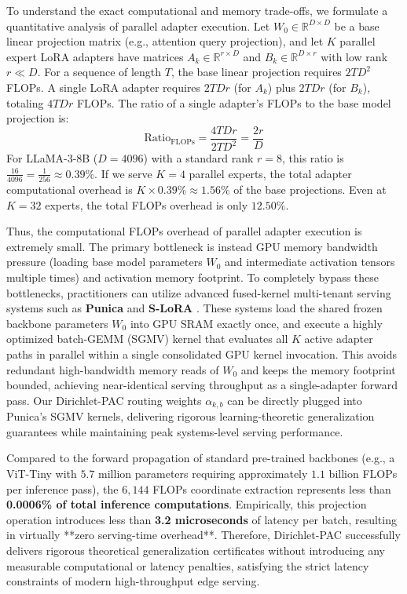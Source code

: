 \begin{itemize}
    To understand the exact computational and memory trade-offs, we formulate a quantitative analysis of parallel adapter execution. Let $W_0 \in \mathbb{R}^{D \times D}$ be a base linear projection matrix (e.g., attention query projection), and let $K$ parallel expert LoRA adapters have matrices $A_k \in \mathbb{R}^{r \times D}$ and $B_k \in \mathbb{R}^{D \times r}$ with low rank $r \ll D$. For a sequence of length $T$, the base linear projection requires $2 T D^2$ FLOPs. A single LoRA adapter requires $2 T D r$ (for $A_k$) plus $2 T D r$ (for $B_k$), totaling $4 T D r$ FLOPs. The ratio of a single adapter's FLOPs to the base model projection is:
    \begin{equation}
      \text{Ratio}_{\text{FLOPs}} = \frac{4 T D r}{2 T D^2} = \frac{2 r}{D}
    \end{equation}
    For LLaMA-3-8B ($D = 4096$) with a standard rank $r = 8$, this ratio is $\frac{16}{4096} = \frac{1}{256} \approx 0.39\%$. If we serve $K = 4$ parallel experts, the total adapter computational overhead is $K \times 0.39\% \approx 1.56\%$ of the base projections. Even at $K=32$ experts, the total FLOPs overhead is only $12.50\%$.
    
    Thus, the computational FLOPs overhead of parallel adapter execution is extremely small. The primary bottleneck is instead GPU memory bandwidth pressure (loading base model parameters $W_0$ and intermediate activation tensors multiple times) and activation memory footprint. To completely bypass these bottlenecks, practitioners can utilize advanced fused-kernel multi-tenant serving systems such as \textbf{Punica} \cite{chen2023punica} and \textbf{S-LoRA} \cite{sheng2023s}. These systems load the shared frozen backbone parameters $W_0$ into GPU SRAM exactly once, and execute a highly optimized batch-GEMM (SGMV) kernel that evaluates all $K$ active adapter paths in parallel within a single consolidated GPU kernel invocation. This avoids redundant high-bandwidth memory reads of $W_0$ and keeps the memory footprint bounded, achieving near-identical serving throughput as a single-adapter forward pass. Our Dirichlet-PAC routing weights $\alpha_{k, b}$ can be directly plugged into Punica's SGMV kernels, delivering rigorous learning-theoretic generalization guarantees while maintaining peak systems-level serving performance.
\end{itemize}

Compared to the forward propagation of standard pre-trained backbones (e.g., a ViT-Tiny with $5.7$ million parameters requiring approximately $1.1$ billion FLOPs per inference pass), the $6,144$ FLOPs coordinate extraction represents less than \textbf{0.0006\% of total inference computations}. Empirically, this projection operation introduces less than \textbf{3.2 microseconds} of latency per batch, resulting in virtually **zero serving-time overhead**. Therefore, Dirichlet-PAC successfully delivers rigorous theoretical generalization certificates without introducing any measurable computational or latency penalties, satisfying the strict latency constraints of modern high-throughput edge serving.

